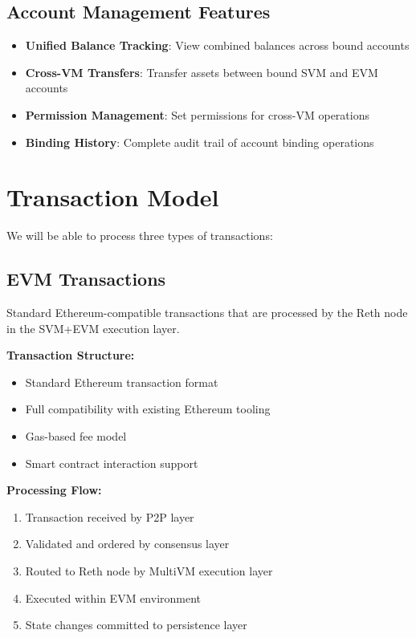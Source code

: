 \documentclass[11pt,a4paper]{article}
\begin{document}
\subsection{Account Management Features}
\begin{itemize}
    \item \textbf{Unified Balance Tracking}: View combined balances across bound accounts
    \item \textbf{Cross-VM Transfers}: Transfer assets between bound SVM and EVM accounts
    \item \textbf{Permission Management}: Set permissions for cross-VM operations
    \item \textbf{Binding History}: Complete audit trail of account binding operations
\end{itemize}

\section{Transaction Model}

We will be able to process three types of transactions:

\subsection{EVM Transactions}
Standard Ethereum-compatible transactions that are processed by the Reth node in the SVM+EVM execution layer.

\textbf{Transaction Structure:}
\begin{itemize}
    \item Standard Ethereum transaction format
    \item Full compatibility with existing Ethereum tooling
    \item Gas-based fee model
    \item Smart contract interaction support
\end{itemize}

\textbf{Processing Flow:}
\begin{enumerate}
    \item Transaction received by P2P layer
    \item Validated and ordered by consensus layer
    \item Routed to Reth node by MultiVM execution layer
    \item Executed within EVM environment
    \item State changes committed to persistence layer
\end{enumerate}
\end{document}
